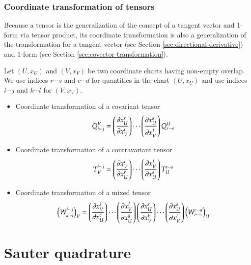\documentclass[11pt, a4paper]{book}
\begin{document}
\subsection{Coordinate transformation of tensors}

Because a tensor is the generalization of the concept of a tangent vector and 1-form via
tensor product, its coordinate transformation is also a generalization of the
transformation for a tangent vector (see Section \ref{sec:directional-derivative}) and
1-form (see Section \ref{sec:covector-transformation}).

Let $(U,x_U)$ and $(V,x_V)$ be two coordinate charts having non-empty overlap. We use
indices $r\cdots s$ and $c\cdots d$ for quantities in the chart $(U,x_U)$ and use indices
$i\cdots j$ and $k\cdots l$ for $(V,x_V)$.
\begin{itemize}
\item Coordinate transformation of a covariant tensor
  \begin{equation}
    \label{eq:covariant-tensor-transform}
    Q_{i\cdots j}^V = \left( \frac{\partial x_U^r}{\partial x_V^i} \right) \cdots \left(
      \frac{\partial x_U^s}{\partial x_V^j} \right) Q_{r \cdots s}^U
  \end{equation}
\item Coordinate transformation of a contravariant tensor
  \begin{equation}
    \label{eq:contravariant-tensor-transform}
    T_V^{i \cdots j} = \left( \frac{\partial x_V^i}{\partial x_U^r} \right) \cdots \left(
      \frac{\partial x_V^j}{\partial x_U^s} \right) T_U^{r \cdots s}
  \end{equation}
\item Coordinate transformation of a mixed tensor
  \begin{equation}
    \label{eq:mixed-tensor-transform}
    \left( W^{i \cdots j}_{k \cdots l} \right)_V = \left( \frac{\partial x_V^i}{\partial x_U^c} \right)
    \cdots \left( \frac{\partial x_V^j}{\partial x_U^d} \right) \left( \frac{\partial
        x_U^r}{\partial x_V^k} \right) \cdots \left( \frac{\partial x_U^s}{\partial x_V^l}
    \right) \left( W^{c \cdots d}_{r \cdots s} \right)_U
  \end{equation}
\end{itemize}

\chapter{Sauter quadrature}
\label{sec:sauter-quad}
\end{document}
